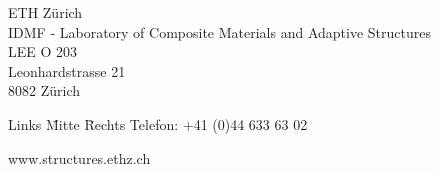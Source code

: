 {\begin{table}[!b]
	\end{table}
	\newpage
	\thispagestyle{empty}
	\vspace*{140mm}
	\begin{table}[!b]
	\begin{flushleft}
			{
			\renewcommand{\baselinestretch}{1}
			\small ETH Z\"urich\\
			\small IDMF - Laboratory of Composite Materials and Adaptive Structures\\
			\small LEE O 203\\
			\small Leonhardstrasse 21\\
			\small 8082 Z\"urich\\
			\begin{tabbing}
			Links \= Mitte \= Rechts \kill
			\small Telefon: \> \> +41 (0)44 633 63 02\\
			\end{tabbing}
			\small www.structures.ethz.ch\\
			}
	\end{flushleft}
	\end{table}
	\clearpage
}